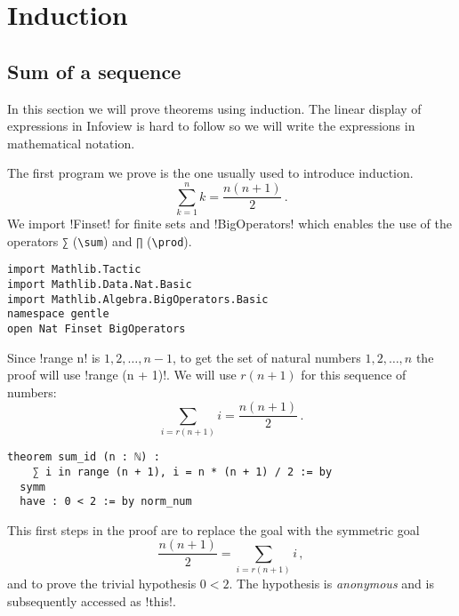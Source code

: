 
\section{Induction}

\subsection{Sum of a sequence}

In this section we will prove theorems using induction. The linear display of expressions in Infoview is hard to follow so we will write the expressions in mathematical notation.

The first program we prove is the one usually used to introduce induction. \[
\sum_{k=1}^{n} k = \frac{n(n+1)}{2}\,.
\]
We import !Finset! for finite sets and !BigOperators! which enables the use of the operators \Verb+∑+ (\Verb+\sum+) and \Verb+∏+  (\Verb+\prod+).
\begin{Verbatim}
import Mathlib.Tactic
import Mathlib.Data.Nat.Basic
import Mathlib.Algebra.BigOperators.Basic
namespace gentle
open Nat Finset BigOperators
\end{Verbatim}



Since !range n! is $1,2,\ldots,n-1$, to get the set of natural numbers $1,2,\ldots,n$ the proof will use !range (n + 1)!. We will use $r(n+1)$ for this sequence of numbers:
\[
\sum_{i=r(n+1)} i = \frac{n(n+1)}{2}\,.
\]
\begin{Verbatim}[firstnumber=last]
theorem sum_id (n : ℕ) :
    ∑ i in range (n + 1), i = n * (n + 1) / 2 := by
  symm
  have : 0 < 2 := by norm_num
\end{Verbatim}

This first steps in the proof are to replace the goal with the symmetric goal
\[
\frac{n(n+1)}{2} = \sum_{i=r(n+1)} i\,,
\]
and to prove the trivial hypothesis $0<2$. The hypothesis is \emph{anonymous} and is subsequently accessed as !this!.


